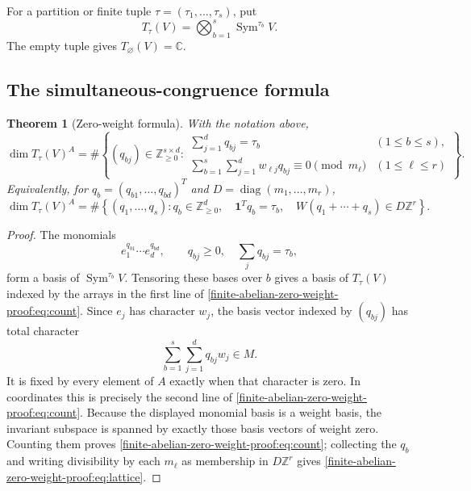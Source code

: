 \documentclass[10pt]{article}
\newcommand{\Sym}{\operatorname{Sym}}
\newcommand{\one}{\mathbf 1}
\newtheorem{theorem}{Theorem}
\begin{document}
For a partition or finite tuple $\tau=(\tau_1,\ldots,\tau_s)$, put
\[
 T_\tau(V)=\bigotimes_{b=1}^{s}\Sym^{\tau_b}V.
\]
The empty tuple gives $T_\varnothing(V)=\mathbb C$.

\subsection{The simultaneous-congruence formula}

\begin{theorem}[Zero-weight formula]\label{finite-abelian-zero-weight-proof:thm:main}
With the notation above,
\begin{equation}\label{finite-abelian-zero-weight-proof:eq:count}
 \dim T_\tau(V)^A=
 \#\left\{(q_{bj})\in\mathbb Z_{\ge0}^{s\times d}:
 \begin{array}{ll}
 \displaystyle\sum_{j=1}^{d}q_{bj}=\tau_b
   & (1\le b\le s),\\[4pt]
 \displaystyle\sum_{b=1}^{s}\sum_{j=1}^{d}
 w_{\ell j}q_{bj}\equiv0\pmod {m_\ell}
   & (1\le\ell\le r)
 \end{array}\right\}.
\end{equation}
Equivalently, for $q_b=(q_{b1},\ldots,q_{bd})^T$ and
$D=\operatorname{diag}(m_1,\ldots,m_r)$,
\begin{equation}\label{finite-abelian-zero-weight-proof:eq:lattice}
 \dim T_\tau(V)^A=
 \#\left\{(q_1,\ldots,q_s):
 q_b\in\mathbb Z_{\ge0}^{d},\quad
 \one^Tq_b=\tau_b,\quad
 W(q_1+\cdots+q_s)\in D\mathbb Z^r\right\}.
\end{equation}
\end{theorem}

\begin{proof}
The monomials
\[
 e_1^{q_{b1}}\cdots e_d^{q_{bd}},\qquad
 q_{bj}\ge0,\quad \sum_jq_{bj}=\tau_b,
\]
form a basis of $\Sym^{\tau_b}V$.  Tensoring these bases over $b$ gives a
basis of $T_\tau(V)$ indexed by the arrays in the first line of
\eqref{finite-abelian-zero-weight-proof:eq:count}.  Since $e_j$ has character $w_j$, the basis vector indexed
by $(q_{bj})$ has total character
\[
 \sum_{b=1}^{s}\sum_{j=1}^{d}q_{bj}w_j\in M.
\]
It is fixed by every element of $A$ exactly when that character is zero.  In
coordinates this is precisely the second line of \eqref{finite-abelian-zero-weight-proof:eq:count}.  Because
the displayed monomial basis is a weight basis, the invariant subspace is
spanned by exactly those basis vectors of weight zero.  Counting them proves
\eqref{finite-abelian-zero-weight-proof:eq:count}; collecting the $q_b$ and writing divisibility by each
$m_\ell$ as membership in $D\mathbb Z^r$ gives \eqref{finite-abelian-zero-weight-proof:eq:lattice}.
\end{proof}
\end{document}
